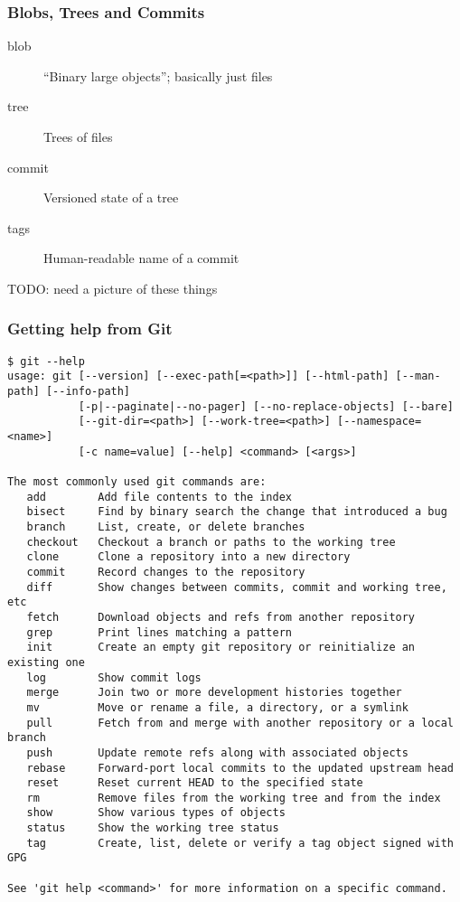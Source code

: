 \begin{frame}[fragile]
\frametitle{Blobs, Trees and Commits}
\begin{description}
\item[blob] \enquote{Binary large objects}; basically just files
\item[tree] Trees of files
\item[commit] Versioned state of a tree
\item[tags] Human-readable name of a commit
\end{description}
TODO: need a picture of these things
\end{frame}

\begin{frame}[fragile]
\frametitle{Getting help from Git}
\vspace*{-3mm}
\begin{lstlisting}[basicstyle=\tiny\ttfamily\color{black}]
$ git --help
usage: git [--version] [--exec-path[=<path>]] [--html-path] [--man-path] [--info-path]
           [-p|--paginate|--no-pager] [--no-replace-objects] [--bare]
           [--git-dir=<path>] [--work-tree=<path>] [--namespace=<name>]
           [-c name=value] [--help] <command> [<args>]

The most commonly used git commands are:
   add        Add file contents to the index
   bisect     Find by binary search the change that introduced a bug
   branch     List, create, or delete branches
   checkout   Checkout a branch or paths to the working tree
   clone      Clone a repository into a new directory
   commit     Record changes to the repository
   diff       Show changes between commits, commit and working tree, etc
   fetch      Download objects and refs from another repository
   grep       Print lines matching a pattern
   init       Create an empty git repository or reinitialize an existing one
   log        Show commit logs
   merge      Join two or more development histories together
   mv         Move or rename a file, a directory, or a symlink
   pull       Fetch from and merge with another repository or a local branch
   push       Update remote refs along with associated objects
   rebase     Forward-port local commits to the updated upstream head
   reset      Reset current HEAD to the specified state
   rm         Remove files from the working tree and from the index
   show       Show various types of objects
   status     Show the working tree status
   tag        Create, list, delete or verify a tag object signed with GPG

See 'git help <command>' for more information on a specific command.
\end{lstlisting}
\end{frame}

